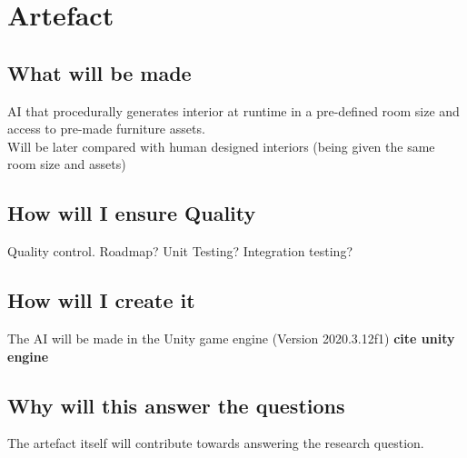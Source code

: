 \section{Artefact}

\subsection{What will be made}
AI that procedurally generates interior at runtime in a pre-defined room size and access to pre-made furniture assets.
\\
Will be later compared with human designed interiors (being given the same room size and assets)

\subsection{How will I ensure Quality}
Quality control. Roadmap? Unit Testing? Integration testing?

\subsection{How will I create it}
The AI will be made in the Unity game engine (Version 2020.3.12f1) \textbf{cite unity engine}

\subsection{Why will this answer the questions}
The artefact itself will contribute towards answering the research question.